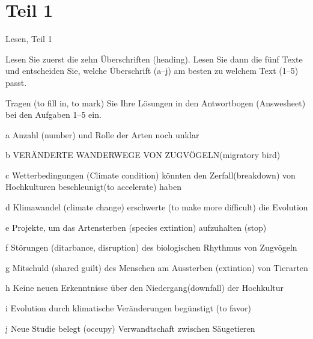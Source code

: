 \section{Teil 1}
    Lesen, Teil 1
    
    Lesen Sie zuerst die zehn Überschriften (heading). Lesen Sie dann die fünf Texte und entscheiden Sie, welche Überschrift (a–j) am besten zu welchem Text (1–5) passt.
    
    Tragen (to fill in, to mark) Sie Ihre Lösungen in den Antwortbogen (Answesheet) bei den Aufgaben 1–5 ein.
    
    a Anzahl (number) und Rolle der Arten noch unklar
    
    b VERÄNDERTE WANDERWEGE VON ZUGVÖGELN(migratory bird)
    
    c Wetterbedingungen (Climate condition) könnten den Zerfall(breakdown) von Hochkulturen beschleunigt(to accelerate) haben
    
    d Klimawandel (climate change) erschwerte (to make more difficult) die Evolution
    
    e Projekte, um das Artensterben (species extintion) aufzuhalten (stop)
    
    f Störungen (ditarbance, disruption) des biologischen Rhythmus von Zugvögeln
    
    g Mitschuld (shared guilt) des Menschen am Aussterben (extintion) von Tierarten
    
    h Keine neuen Erkenntnisse über den Niedergang(downfall) der Hochkultur
    
    i Evolution durch klimatische Veränderungen begünstigt (to favor)
    
    j Neue Studie belegt (occupy) Verwandtschaft zwischen Säugetieren
